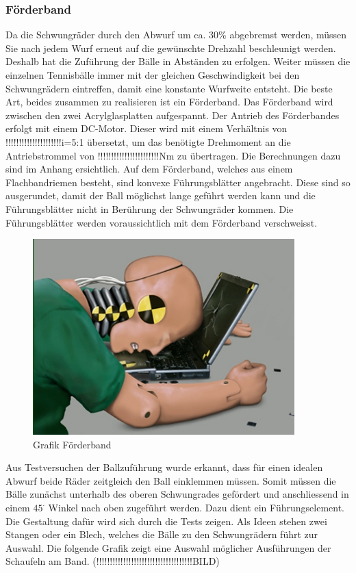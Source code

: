 \subsubsection{Förderband}
Da die Schwungräder durch den Abwurf um ca. 30\% abgebremst werden, müssen Sie nach jedem Wurf erneut auf die gewünschte Drehzahl beschleunigt werden. Deshalb hat die Zuführung der Bälle in Abständen zu erfolgen. Weiter müssen die einzelnen Tennisbälle immer mit der gleichen Geschwindigkeit bei den Schwungrädern eintreffen, damit eine konstante Wurfweite entsteht. Die beste Art, beides zusammen zu realisieren ist ein Förderband. Das Förderband wird zwischen den zwei Acrylglasplatten aufgespannt. Der Antrieb des Förderbandes erfolgt mit einem DC-Motor. Dieser wird mit einem Verhältnis von !!!!!!!!!!!!!!!!!!!!!i=5:1 übersetzt, um das benötigte Drehmoment an die Antriebstrommel von !!!!!!!!!!!!!!!!!!!!!!!Nm zu übertragen. Die Berechnungen dazu sind im Anhang ersichtlich. Auf dem Förderband, welches aus einem Flachbandriemen besteht, sind konvexe Führungsblätter angebracht. Diese sind so ausgerundet, damit der Ball möglichst lange geführt werden kann und die Führungsblätter nicht in Berührung der Schwungräder kommen. Die Führungsblätter werden voraussichtlich mit dem Förderband verschweisst.
\newpage
\begin{figure} [h!]
	\centering
	\includegraphics[width=0.9\textwidth]{Enddokumentation/CrashTestDummy.jpg}
	\caption{Grafik Förderband}
	\label{fig:Grafik Förderband}	
\end{figure}
Aus Testversuchen der Ballzuführung wurde erkannt, dass für einen idealen Abwurf beide Räder zeitgleich den Ball einklemmen müssen. Somit müssen die Bälle zunächst unterhalb des oberen Schwungrades gefördert und anschliessend in einem $45^\cdot$ Winkel nach oben zugeführt werden. Dazu dient ein Führungselement. Die Gestaltung dafür wird sich durch die Tests zeigen. Als Ideen stehen zwei Stangen oder ein Blech, welches die Bälle zu den Schwungrädern führt zur Auswahl. Die folgende Grafik zeigt eine Auswahl möglicher Ausführungen der Schaufeln am Band. (!!!!!!!!!!!!!!!!!!!!!!!!!!!!!!!!!!!!BILD)
